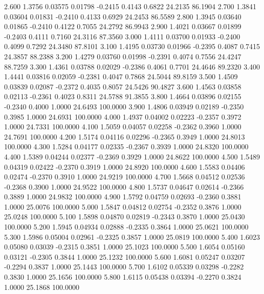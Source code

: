    2.600   1.3756   0.03575   0.01798  -0.2415   0.4143   0.6822  24.2135  86.1904
   2.700   1.3841   0.03604   0.01831  -0.2410   0.4133   0.6929  24.2453  86.5589
   2.800   1.3945   0.03640   0.01865  -0.2410   0.4122   0.7055  24.2792  86.9943
   2.900   1.4021   0.03667   0.01899  -0.2403   0.4111   0.7160  24.3116  87.3560
   3.000   1.4111   0.03700   0.01933  -0.2400   0.4099   0.7292  24.3480  87.8101
   3.100   1.4195   0.03730   0.01966  -0.2395   0.4087   0.7415  24.3857  88.2388
   3.200   1.4279   0.03760   0.01998  -0.2391   0.4074   0.7556  24.4247  88.7259
   3.300   1.4361   0.03788   0.02029  -0.2386   0.4061   0.7701  24.4646  89.2320
   3.400   1.4441   0.03816   0.02059  -0.2381   0.4047   0.7868  24.5044  89.8159
   3.500   1.4509   0.03839   0.02087  -0.2372   0.4035   0.8057  24.5426  90.4827
   3.600   1.4563   0.03858   0.02113  -0.2361   0.4023   0.8311  24.5788  91.3855
   3.800   1.4664   0.03896   0.02155  -0.2340   0.4000   1.0000  24.6493 100.0000
   3.900   1.4806   0.03949   0.02189  -0.2350   0.3985   1.0000  24.6931 100.0000
   4.000   1.4937   0.04002   0.02223  -0.2357   0.3972   1.0000  24.7331 100.0000
   4.100   1.5059   0.04057   0.02258  -0.2362   0.3960   1.0000  24.7691 100.0000
   4.200   1.5174   0.04116   0.02296  -0.2365   0.3949   1.0000  24.8013 100.0000
   4.300   1.5284   0.04177   0.02335  -0.2367   0.3939   1.0000  24.8320 100.0000
   4.400   1.5389   0.04244   0.02377  -0.2369   0.3929   1.0000  24.8622 100.0000
   4.500   1.5489   0.04319   0.02422  -0.2370   0.3919   1.0000  24.8920 100.0000
   4.600   1.5583   0.04406   0.02474  -0.2370   0.3910   1.0000  24.9219 100.0000
   4.700   1.5668   0.04512   0.02536  -0.2368   0.3900   1.0000  24.9522 100.0000
   4.800   1.5737   0.04647   0.02614  -0.2366   0.3889   1.0000  24.9832 100.0000
   4.900   1.5792   0.04759   0.02693  -0.2360   0.3881   1.0000  25.0076 100.0000
   5.000   1.5847   0.04812   0.02754  -0.2352   0.3876   1.0000  25.0248 100.0000
   5.100   1.5898   0.04870   0.02819  -0.2343   0.3870   1.0000  25.0430 100.0000
   5.200   1.5945   0.04934   0.02888  -0.2335   0.3864   1.0000  25.0621 100.0000
   5.300   1.5986   0.05004   0.02961  -0.2325   0.3857   1.0000  25.0819 100.0000
   5.400   1.6023   0.05080   0.03039  -0.2315   0.3851   1.0000  25.1023 100.0000
   5.500   1.6054   0.05160   0.03121  -0.2305   0.3844   1.0000  25.1232 100.0000
   5.600   1.6081   0.05247   0.03207  -0.2294   0.3837   1.0000  25.1443 100.0000
   5.700   1.6102   0.05339   0.03298  -0.2282   0.3830   1.0000  25.1656 100.0000
   5.800   1.6115   0.05438   0.03394  -0.2270   0.3824   1.0000  25.1868 100.0000
